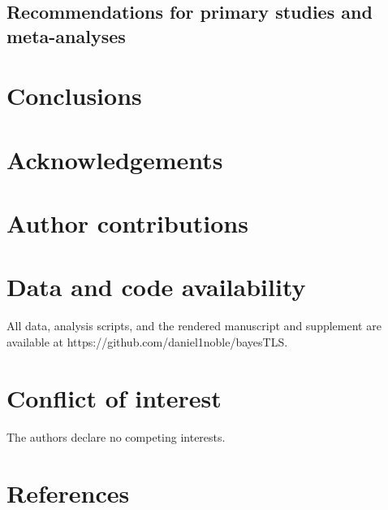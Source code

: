 \documentclass[
  11pt,
]{article}
\begin{document}
\subsection{Recommendations for primary studies and
meta-analyses}\label{recommendations-for-primary-studies-and-meta-analyses}

\section{Conclusions}\label{conclusions}

\section{Acknowledgements}\label{acknowledgements}

\section*{Author contributions}\label{author-contributions}

\section*{Data and code availability}\label{data-and-code-availability}

All data, analysis scripts, and the rendered manuscript and supplement
are available at https://github.com/daniel1noble/bayesTLS.

\section*{Conflict of interest}\label{conflict-of-interest}

The authors declare no competing interests.

\section*{References}\label{references}
\end{document}
